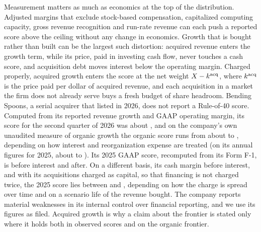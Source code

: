 Measurement matters as much as economics at the top of the distribution. Adjusted margins that exclude stock-based compensation, capitalized computing capacity, gross revenue recognition and run-rate revenue can each push a reported score above the ceiling without any change in economics. Growth that is bought rather than built can be the largest such distortion: acquired revenue enters the growth term, while its price, paid in investing cash flow, never touches a cash score, and acquisition debt moves interest below the operating margin. Charged properly, acquired growth enters the score at the net weight $X-k^{\rm acq}$, where $k^{\rm acq}$ is the price paid per dollar of acquired revenue, and each acquisition in a market the firm does not already serve buys a fresh budget of share headroom. Bending Spoons, a serial acquirer that listed in 2026, does not report a Rule-of-40 score. Computed from its reported revenue growth and GAAP operating margin, its score for the second quarter of 2026 was about \acqRQTwoRep, and on the company's own unaudited measure of organic growth the organic score runs from about \acqRQTwoOrgIntR{} to \acqRQTwoOrgNoReorgR, depending on how interest and reorganization expense are treated (on its annual figures for 2025, about \acqROrgIntTwentyFiveR{} to \acqROrgNoReorgTwentyFiveR). Its 2025 GAAP score, recomputed from its Form F-1, is \acqRGaapTwentyFive{} before interest and \acqRIntTwentyFive{} after. On a different basis, its cash margin before interest, and with its acquisitions charged as capital, so that financing is not charged twice, the 2025 score lies between \acqConvLo{} and \acqConvHi, depending on how the charge is spread over time and on a scenario life of the revenue bought. The company reports material weaknesses in its internal control over financial reporting, and we use its figures as filed. Acquired growth is why a claim about the frontier is stated only where it holds both in observed scores and on the organic frontier.

